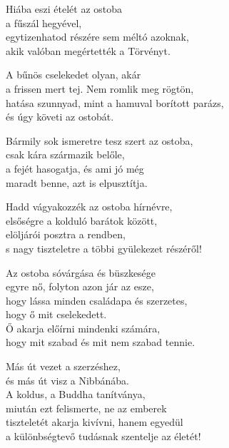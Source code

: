 \begin{dhpverse}

 Hiába eszi ételét az ostoba\\
a fűszál hegyével,\\
egytizenhatod részére sem méltó azoknak,\\
akik valóban megértették a Törvényt.

 A bűnös cselekedet olyan, akár\\
a frissen mert tej. Nem romlik meg rögtön,\\
hatása szunnyad, mint a hamuval borított parázs,\\
és úgy követi az ostobát.

 Bármily sok ismeretre tesz szert az ostoba,\\
csak kára származik belőle,\\
a fejét hasogatja, és ami jó még\\
maradt benne, azt is elpusztítja.

 Hadd vágyakozzék az ostoba hírnévre,\\
elsőségre a kolduló barátok között,\\
elöljárói posztra a rendben,\\
s nagy tiszteletre a többi gyülekezet részéről!

 Az ostoba sóvárgása és büszkesége\\
egyre nő, folyton azon jár az esze,\\
hogy lássa minden családapa és szerzetes,\\
hogy ő mit cselekedett.\\
Ő akarja előírni mindenki számára,\\
hogy mit szabad és mit nem szabad tennie.

\end{dhpverse}
\newpage
\begin{dhpverse}

 Más út vezet a szerzéshez,\\
és más út visz a Nibbánába.\\
A koldus, a Buddha tanítványa,\\
miután ezt felismerte, ne az emberek\\
tiszteletét akarja kivívni, hanem egyedül\\
a különbségtevő tudásnak szentelje az életét!

\end{dhpverse}

